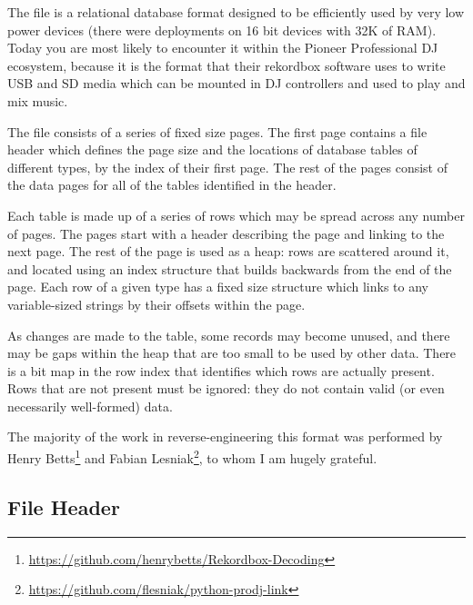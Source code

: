 \documentclass[11pt]{article}
\begin{document}
The file is a relational database format designed to be efficiently
used by very low power devices (there were deployments on 16 bit
devices with 32K of RAM). Today you are most likely to encounter it
within the Pioneer Professional DJ ecosystem, because it is the format
that their rekordbox software uses to write USB and SD media which can
be mounted in DJ controllers and used to play and mix music.

The file consists of a series of fixed size pages. The first page
contains a file header which defines the page size and the locations
of database tables of different types, by the index of their first
page. The rest of the pages consist of the data pages for all of the
tables identified in the header.

Each table is made up of a series of rows which may be spread across
any number of pages. The pages start with a header describing the page
and linking to the next page. The rest of the page is used as a heap:
rows are scattered around it, and located using an index structure
that builds backwards from the end of the page. Each row of a given
type has a fixed size structure which links to any variable-sized
strings by their offsets within the page.

As changes are made to the table, some records may become unused, and
there may be gaps within the heap that are too small to be used by
other data. There is a bit map in the row index that identifies which
rows are actually present. Rows that are not present must be ignored:
they do not contain valid (or even necessarily well-formed) data.

The majority of the work in reverse-engineering this format was
performed by Henry
Betts\footnote{\url{https://github.com/henrybetts/Rekordbox-Decoding}}
and Fabian
Lesniak\footnote{\url{https://github.com/flesniak/python-prodj-link}},
to whom I am hugely grateful.

\subsection{File Header}
\end{document}
